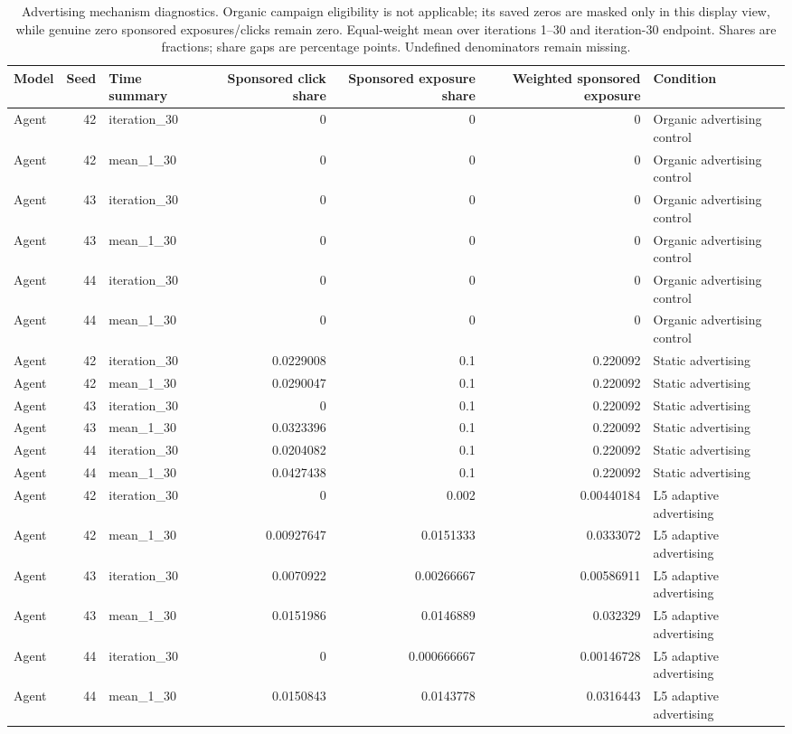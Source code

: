 \begin{table}[htbp!]
\centering
\small
\setlength{\tabcolsep}{3pt}
\renewcommand{\arraystretch}{1.1}
\begin{tabular}{lrlrrrl}
\hline
Model & Seed & Time summary & Sponsored click share & Sponsored exposure share & Weighted sponsored exposure & Condition \\
\hline
Agent & 42 & iteration\_30 & 0 & 0 & 0 & Organic advertising control \\
Agent & 42 & mean\_1\_30 & 0 & 0 & 0 & Organic advertising control \\
Agent & 43 & iteration\_30 & 0 & 0 & 0 & Organic advertising control \\
Agent & 43 & mean\_1\_30 & 0 & 0 & 0 & Organic advertising control \\
Agent & 44 & iteration\_30 & 0 & 0 & 0 & Organic advertising control \\
Agent & 44 & mean\_1\_30 & 0 & 0 & 0 & Organic advertising control \\
Agent & 42 & iteration\_30 & 0.0229008 & 0.1 & 0.220092 & Static advertising \\
Agent & 42 & mean\_1\_30 & 0.0290047 & 0.1 & 0.220092 & Static advertising \\
Agent & 43 & iteration\_30 & 0 & 0.1 & 0.220092 & Static advertising \\
Agent & 43 & mean\_1\_30 & 0.0323396 & 0.1 & 0.220092 & Static advertising \\
Agent & 44 & iteration\_30 & 0.0204082 & 0.1 & 0.220092 & Static advertising \\
Agent & 44 & mean\_1\_30 & 0.0427438 & 0.1 & 0.220092 & Static advertising \\
Agent & 42 & iteration\_30 & 0 & 0.002 & 0.00440184 & L5 adaptive advertising \\
Agent & 42 & mean\_1\_30 & 0.00927647 & 0.0151333 & 0.0333072 & L5 adaptive advertising \\
Agent & 43 & iteration\_30 & 0.0070922 & 0.00266667 & 0.00586911 & L5 adaptive advertising \\
Agent & 43 & mean\_1\_30 & 0.0151986 & 0.0146889 & 0.032329 & L5 adaptive advertising \\
Agent & 44 & iteration\_30 & 0 & 0.000666667 & 0.00146728 & L5 adaptive advertising \\
Agent & 44 & mean\_1\_30 & 0.0150843 & 0.0143778 & 0.0316443 & L5 adaptive advertising \\
\hline
\end{tabular}
\caption{Advertising mechanism diagnostics. Organic campaign eligibility is not applicable; its saved zeros are masked only in this display view, while genuine zero sponsored exposures/clicks remain zero. Equal-weight mean over iterations 1--30 and iteration-30 endpoint. Shares are fractions; share gaps are percentage points. Undefined denominators remain missing.}
\label{chap:results:tab:rq1_advertising_sponsored_shares}
\end{table}
